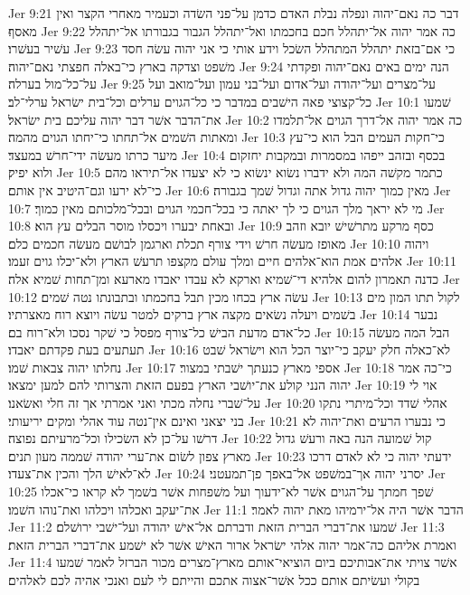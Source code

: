 Jer 9:21  דבר כה נאם־יהוה ונפלה נבלת האדם כדמן על־פני השׂדה וכעמיר מאחרי הקצר ואין מאסף׃
Jer 9:22  כה אמר יהוה אל־יתהלל חכם בחכמתו ואל־יתהלל הגבור בגבורתו אל־יתהלל עשׁיר בעשׁרו׃
Jer 9:23  כי אם־בזאת יתהלל המתהלל השׂכל וידע אותי כי אני יהוה עשׂה חסד משׁפט וצדקה בארץ כי־באלה חפצתי נאם־יהוה׃
Jer 9:24  הנה ימים באים נאם־יהוה ופקדתי על־כל־מול בערלה׃
Jer 9:25  על־מצרים ועל־יהודה ועל־אדום ועל־בני עמון ועל־מואב ועל כל־קצוצי פאה הישׁבים במדבר כי כל־הגוים ערלים וכל־בית ישׂראל ערלי־לב׃
Jer 10:1  שׁמעו את־הדבר אשׁר דבר יהוה עליכם בית ישׂראל׃
Jer 10:2  כה אמר יהוה אל־דרך הגוים אל־תלמדו ומאתות השׁמים אל־תחתו כי־יחתו הגוים מהמה׃
Jer 10:3  כי־חקות העמים הבל הוא כי־עץ מיער כרתו מעשׂה ידי־חרשׁ במעצד׃
Jer 10:4  בכסף ובזהב ייפהו במסמרות ובמקבות יחזקום ולוא יפיק׃
Jer 10:5  כתמר מקשׁה המה ולא ידברו נשׂוא ינשׂוא כי לא יצעדו אל־תיראו מהם כי־לא ירעו וגם־היטיב אין אותם׃
Jer 10:6  מאין כמוך יהוה גדול אתה וגדול שׁמך בגבורה׃
Jer 10:7  מי לא יראך מלך הגוים כי לך יאתה כי בכל־חכמי הגוים ובכל־מלכותם מאין כמוך׃
Jer 10:8  ובאחת יבערו ויכסלו מוסר הבלים עץ הוא׃
Jer 10:9  כסף מרקע מתרשׁישׁ יובא וזהב מאופז מעשׂה חרשׁ וידי צורף תכלת וארגמן לבושׁם מעשׂה חכמים כלם׃
Jer 10:10  ויהוה אלהים אמת הוא־אלהים חיים ומלך עולם מקצפו תרעשׁ הארץ ולא־יכלו גוים זעמו׃
Jer 10:11  כדנה תאמרון להום אלהיא די־שׁמיא וארקא לא עבדו יאבדו מארעא ומן־תחות שׁמיא אלה׃
Jer 10:12  עשׂה ארץ בכחו מכין תבל בחכמתו ובתבונתו נטה שׁמים׃
Jer 10:13  לקול תתו המון מים בשׁמים ויעלה נשׂאים מקצה ארץ ברקים למטר עשׂה ויוצא רוח מאצרתיו׃
Jer 10:14  נבער כל־אדם מדעת הבישׁ כל־צורף מפסל כי שׁקר נסכו ולא־רוח בם׃
Jer 10:15  הבל המה מעשׂה תעתעים בעת פקדתם יאבדו׃
Jer 10:16  לא־כאלה חלק יעקב כי־יוצר הכל הוא וישׂראל שׁבט נחלתו יהוה צבאות שׁמו׃
Jer 10:17  אספי מארץ כנעתך ישׁבתי במצור׃
Jer 10:18  כי־כה אמר יהוה הנני קולע את־יושׁבי הארץ בפעם הזאת והצרותי להם למען ימצאו׃
Jer 10:19  אוי לי על־שׁברי נחלה מכתי ואני אמרתי אך זה חלי ואשׂאנו׃
Jer 10:20  אהלי שׁדד וכל־מיתרי נתקו בני יצאני ואינם אין־נטה עוד אהלי ומקים יריעותי׃
Jer 10:21  כי נבערו הרעים ואת־יהוה לא דרשׁו על־כן לא השׂכילו וכל־מרעיתם נפוצה׃
Jer 10:22  קול שׁמועה הנה באה ורעשׁ גדול מארץ צפון לשׂום את־ערי יהודה שׁממה מעון תנים׃
Jer 10:23  ידעתי יהוה כי לא לאדם דרכו לא־לאישׁ הלך והכין את־צעדו׃
Jer 10:24  יסרני יהוה אך־במשׁפט אל־באפך פן־תמעטני׃
Jer 10:25  שׁפך חמתך על־הגוים אשׁר לא־ידעוך ועל משׁפחות אשׁר בשׁמך לא קראו כי־אכלו את־יעקב ואכלהו ויכלהו ואת־נוהו השׁמו׃
Jer 11:1  הדבר אשׁר היה אל־ירמיהו מאת יהוה לאמר׃
Jer 11:2  שׁמעו את־דברי הברית הזאת ודברתם אל־אישׁ יהודה ועל־ישׁבי ירושׁלם׃
Jer 11:3  ואמרת אליהם כה־אמר יהוה אלהי ישׂראל ארור האישׁ אשׁר לא ישׁמע את־דברי הברית הזאת׃
Jer 11:4  אשׁר צויתי את־אבותיכם ביום הוציאי־אותם מארץ־מצרים מכור הברזל לאמר שׁמעו בקולי ועשׂיתם אותם ככל אשׁר־אצוה אתכם והייתם לי לעם ואנכי אהיה לכם לאלהים׃
